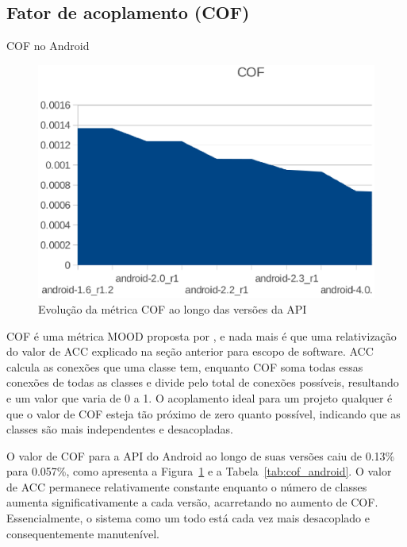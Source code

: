 \subsection{Fator de acoplamento (COF)}

\begin{table}[!htb]
\centering
{}

\caption{COF no Android}
\label{tab:cof_android}
\end{table}

\begin{figure}[!htb]
\centering
\includegraphics [keepaspectratio=true,scale=0.7]{figuras/graphs/cof_android.eps}
\caption{Evolução da métrica COF ao longo das versões da API}
\label{fig:cof_android}
\end{figure}


COF é uma métrica MOOD proposta por , e nada mais é que uma relativização do valor de ACC explicado na seção anterior para escopo de software. ACC calcula as conexões que uma classe tem, enquanto COF soma todas essas conexões de todas as classes e divide pelo total de conexões possíveis, resultando e um valor que varia de 0 a 1. O acoplamento ideal para um projeto qualquer é que o valor de COF esteja tão próximo de zero quanto possível, indicando que as classes são mais independentes e desacopladas.

O valor de COF para a API do Android ao longo de suas versões caiu de 0.13\% para 0.057\%, como apresenta a Figura~\ref{fig:cof_android} e a Tabela~\ref{tab:cof_android}. O valor de ACC permanece relativamente constante enquanto o número de classes aumenta significativamente a cada versão, acarretando no aumento de COF. Essencialmente, o sistema como um todo está cada vez mais desacoplado e consequentemente manutenível. 

